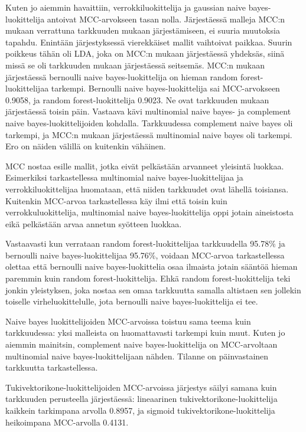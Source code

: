 \documentclass[finnish,twoside,openright]{HYgraduMLDS}
\begin{document}
Kuten jo aiemmin havaittiin, verrokkiluokittelija ja gaussian naive bayes-luokittelija antoivat MCC-arvokseen tasan nolla. Järjestäessä malleja MCC:n mukaan verrattuna tarkkuuden mukaan järjestämiseen, ei suuria muutoksia tapahdu. Enintään järjestyksessä vierekkäiset mallit vaihtoivat paikkaa. Suurin poikkeus tähän oli LDA, joka on MCC:n mukaan järjestäessä yhdeksäs, siinä missä se oli tarkkuuden mukaan järjestäessä seitsemäs. MCC:n mukaan järjestäessä bernoulli naive bayes-luokittelija on hieman random forest-luokittelijaa tarkempi. Bernoulli naive bayes-luokittelija sai MCC-arvokseen 0.9058, ja random forest-luokittelija 0.9023. Ne ovat tarkkuuden mukaan järjestäessä toisin päin. Vastaava kävi multinomial naive bayes- ja complement naive bayes-luokittelijoiden kohdalla. Tarkkuudessa complement naive bayes oli tarkempi, ja MCC:n mukaan järjestäessä multinomial naive bayes oli tarkempi. Ero on näiden välillä on kuitenkin vähäinen.

MCC nostaa esille mallit, jotka eivät pelkästään arvanneet yleisintä luokkaa. Esimerkiksi tarkastellessa multinomial naive bayes-luokittelijaa ja verrokkiluokittelijaa huomataan, että niiden tarkkuudet ovat lähellä toisiansa. Kuitenkin MCC-arvoa tarkastellessa käy ilmi että toisin kuin verrokkuluokittelija, multinomial naive bayes-luokittelija oppi jotain aineistosta eikä pelkästään arvaa annetun syötteen luokkaa.

Vastaavasti kun verrataan random forest-luokittelijaa tarkkuudella 95.78\% ja bernoulli naive bayes-luokittelijaa 95.76\%, voidaan MCC-arvoa tarkastellessa olettaa että bernoulli naive bayes-luokittelia osaa ilmaista jotain sääntöä hieman paremmin kuin random forest-luokittelija. Ehkä random forest-luokittelija teki jonkin yleistyksen, joka nostaa sen omaa tarkkuutta samalla altistaen sen jollekin toiselle virheluokittelulle, jota bernoulli naive bayes-luokittelija ei tee.

Naive bayes luokittelijoiden MCC-arvoissa toistuu sama teema kuin tarkkuudessa: yksi malleista on huomattavasti tarkempi kuin muut. Kuten jo aiemmin mainitsin, complement naive bayes-luokittelija on MCC-arvoltaan multinomial naive bayes-luokittelijaan nähden. Tilanne on päinvastainen tarkkuutta tarkastellessa.

Tukivektorikone-luokittelijoiden MCC-arvoissa järjestys säilyi samana kuin tarkkuuden perusteella järjestäessä: lineaarinen tukivektorikone-luokittelija kaikkein tarkimpana arvolla 0.8957, ja sigmoid tukivektorikone-luokittelija heikoimpana MCC-arvolla 0.4131.
\end{document}
